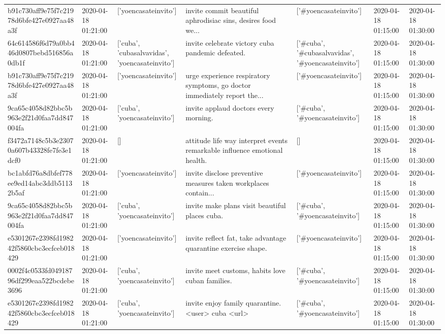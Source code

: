 \begin{tabular}{lllllll}
b91c730aff9e75f7c21978d6bfe427e0927aa48a3f & 2020-04-18 01:21:00 & ['yoencasateinvito'] & invite commit beautiful aphrodisiac sins, desires food we... & ['#yoencasateinvito'] & 2020-04-18 01:15:00 & 2020-04-18 01:30:00 \\
64c614586f6d79a0bb446d0807bebd516856a0db1f & 2020-04-18 01:21:00 & ['cuba', 'cubasalvavidas', 'yoencasateinvito'] & invite celebrate victory cuba pandemic defeated. & ['#cuba', '#cubasalvavidas', '#yoencasateinvito'] & 2020-04-18 01:15:00 & 2020-04-18 01:30:00 \\
b91c730aff9e75f7c21978d6bfe427e0927aa48a3f & 2020-04-18 01:21:00 & ['yoencasateinvito'] & urge experience respiratory symptoms, go doctor immediately report the... & ['#yoencasateinvito'] & 2020-04-18 01:15:00 & 2020-04-18 01:30:00 \\
9ca65c4058d82bbc5b963e2f21d0faa7dd847004fa & 2020-04-18 01:21:00 & ['cuba', 'yoencasateinvito'] & invite applaud doctors every morning. & ['#cuba', '#yoencasateinvito'] & 2020-04-18 01:15:00 & 2020-04-18 01:30:00 \\
f3472a7148c5b3e23070a607b43328fe7fe3e1dcf0 & 2020-04-18 01:21:00 & [] & attitude life way interpret events remarkable influence emotional health. & [] & 2020-04-18 01:15:00 & 2020-04-18 01:30:00 \\
bc1abfd76a8dbfef778ee9ed14abc3ddb51132b5af & 2020-04-18 01:21:00 & ['yoencasateinvito'] & invite disclose preventive measures taken workplaces contain... & ['#yoencasateinvito'] & 2020-04-18 01:15:00 & 2020-04-18 01:30:00 \\
9ca65c4058d82bbc5b963e2f21d0faa7dd847004fa & 2020-04-18 01:21:00 & ['cuba', 'yoencasateinvito'] & invite make plans visit beautiful places cuba. & ['#cuba', '#yoencasateinvito'] & 2020-04-18 01:15:00 & 2020-04-18 01:30:00 \\
e5301267e2398fd198242f5860cbc3ecfceb018429 & 2020-04-18 01:21:00 & ['yoencasateinvito'] & invite reflect fat, take advantage quarantine exercise shape. & ['#yoencasateinvito'] & 2020-04-18 01:15:00 & 2020-04-18 01:30:00 \\
0002f4c0533fd04918796df299eaa522bcdebe3696 & 2020-04-18 01:21:00 & ['cuba', 'yoencasateinvito'] & invite meet customs, habits love cuban families. & ['#cuba', '#yoencasateinvito'] & 2020-04-18 01:15:00 & 2020-04-18 01:30:00 \\
e5301267e2398fd198242f5860cbc3ecfceb018429 & 2020-04-18 01:21:00 & ['cuba', 'yoencasateinvito'] & invite enjoy family quarantine. <user> cuba <url> & ['#cuba', '#yoencasateinvito'] & 2020-04-18 01:15:00 & 2020-04-18 01:30:00 \\

\end{tabular}
